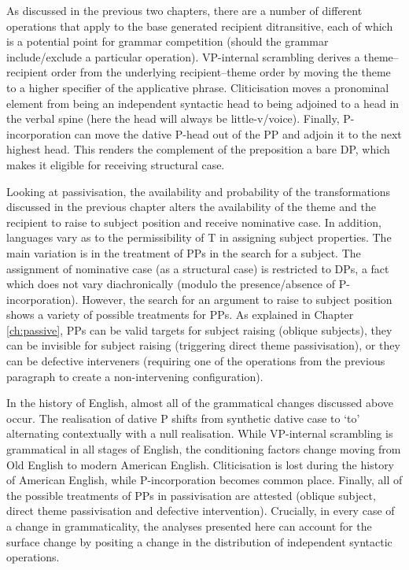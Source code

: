 	As discussed in the previous two chapters, there are a number of different operations that apply to the base generated recipient ditransitive, each of which is a potential point for grammar competition (should the grammar include/exclude a particular operation). VP-internal scrambling derives a theme--recipient order from the underlying recipient--theme order by moving the theme to a higher specifier of the applicative phrase. Cliticisation moves a pronominal element from being an independent syntactic head to being adjoined to a head in the verbal spine (here the head will always be little-v/voice). Finally, P-incorporation can move the dative P-head out of the PP and adjoin it to the next highest head. This renders the complement of the preposition a bare DP, which makes it eligible for receiving structural case.

	Looking at passivisation, the availability and probability of the transformations discussed in the previous chapter alters the availability of the theme and the recipient to raise to subject position and receive nominative case. In addition, languages vary as to the permissibility of T in assigning subject properties. The main variation is in the treatment of PPs in the search for a subject. The assignment of nominative case (as a structural case) is restricted to DPs, a fact which does not vary diachronically (modulo the presence/absence of P-incorporation). However, the search for an argument to raise to subject position shows a variety of possible treatments for PPs. As explained in Chapter \ref{ch:passive}, PPs can be valid targets for subject raising (oblique subjects), they can be invisible for subject raising (triggering direct theme passivisation), or they can be defective interveners (requiring one of the operations from the previous paragraph to create a non-intervening configuration).

	In the history of English, almost all of the grammatical changes discussed above occur. The realisation of dative P shifts from synthetic dative case to `to' alternating contextually with a null realisation. While VP-internal scrambling is grammatical in all stages of English, the conditioning factors change moving from Old English to modern American English. Cliticisation is lost during the history of American English, while P-incorporation becomes common place. Finally, all of the possible treatments of PPs in passivisation are attested (oblique subject, direct theme passivisation and defective intervention). Crucially, in every case of a change in grammaticality, the analyses presented here can account for the surface change by positing a change in the distribution of independent syntactic operations.

